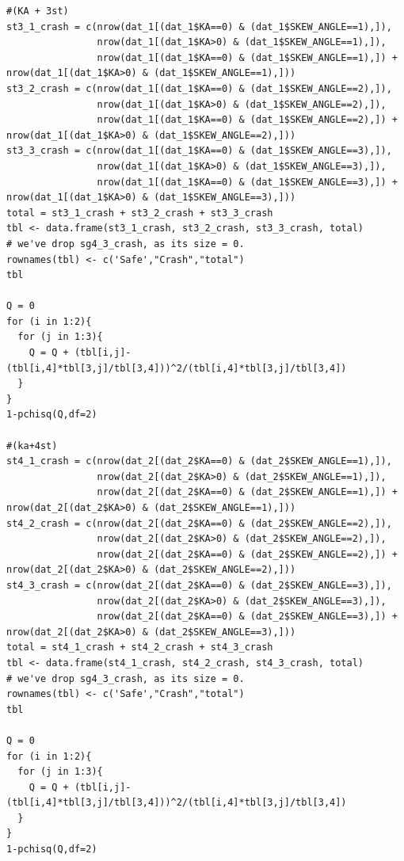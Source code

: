 \documentclass[11pt]{scrartcl} %
\begin{document}
\begin{lstlisting}
#(KA + 3st)
st3_1_crash = c(nrow(dat_1[(dat_1$KA==0) & (dat_1$SKEW_ANGLE==1),]),
                nrow(dat_1[(dat_1$KA>0) & (dat_1$SKEW_ANGLE==1),]),
                nrow(dat_1[(dat_1$KA==0) & (dat_1$SKEW_ANGLE==1),]) + nrow(dat_1[(dat_1$KA>0) & (dat_1$SKEW_ANGLE==1),]))
st3_2_crash = c(nrow(dat_1[(dat_1$KA==0) & (dat_1$SKEW_ANGLE==2),]),
                nrow(dat_1[(dat_1$KA>0) & (dat_1$SKEW_ANGLE==2),]),
                nrow(dat_1[(dat_1$KA==0) & (dat_1$SKEW_ANGLE==2),]) + nrow(dat_1[(dat_1$KA>0) & (dat_1$SKEW_ANGLE==2),]))
st3_3_crash = c(nrow(dat_1[(dat_1$KA==0) & (dat_1$SKEW_ANGLE==3),]),
                nrow(dat_1[(dat_1$KA>0) & (dat_1$SKEW_ANGLE==3),]),
                nrow(dat_1[(dat_1$KA==0) & (dat_1$SKEW_ANGLE==3),]) + nrow(dat_1[(dat_1$KA>0) & (dat_1$SKEW_ANGLE==3),]))
total = st3_1_crash + st3_2_crash + st3_3_crash
tbl <- data.frame(st3_1_crash, st3_2_crash, st3_3_crash, total)
# we've drop sg4_3_crash, as its size = 0.
rownames(tbl) <- c('Safe',"Crash","total")
tbl

Q = 0
for (i in 1:2){
  for (j in 1:3){
    Q = Q + (tbl[i,j]-(tbl[i,4]*tbl[3,j]/tbl[3,4]))^2/(tbl[i,4]*tbl[3,j]/tbl[3,4])
  }
}
1-pchisq(Q,df=2)

#(ka+4st)
st4_1_crash = c(nrow(dat_2[(dat_2$KA==0) & (dat_2$SKEW_ANGLE==1),]),
                nrow(dat_2[(dat_2$KA>0) & (dat_2$SKEW_ANGLE==1),]),
                nrow(dat_2[(dat_2$KA==0) & (dat_2$SKEW_ANGLE==1),]) + nrow(dat_2[(dat_2$KA>0) & (dat_2$SKEW_ANGLE==1),]))
st4_2_crash = c(nrow(dat_2[(dat_2$KA==0) & (dat_2$SKEW_ANGLE==2),]),
                nrow(dat_2[(dat_2$KA>0) & (dat_2$SKEW_ANGLE==2),]),
                nrow(dat_2[(dat_2$KA==0) & (dat_2$SKEW_ANGLE==2),]) + nrow(dat_2[(dat_2$KA>0) & (dat_2$SKEW_ANGLE==2),]))
st4_3_crash = c(nrow(dat_2[(dat_2$KA==0) & (dat_2$SKEW_ANGLE==3),]),
                nrow(dat_2[(dat_2$KA>0) & (dat_2$SKEW_ANGLE==3),]),
                nrow(dat_2[(dat_2$KA==0) & (dat_2$SKEW_ANGLE==3),]) + nrow(dat_2[(dat_2$KA>0) & (dat_2$SKEW_ANGLE==3),]))
total = st4_1_crash + st4_2_crash + st4_3_crash
tbl <- data.frame(st4_1_crash, st4_2_crash, st4_3_crash, total)
# we've drop sg4_3_crash, as its size = 0.
rownames(tbl) <- c('Safe',"Crash","total")
tbl

Q = 0
for (i in 1:2){
  for (j in 1:3){
    Q = Q + (tbl[i,j]-(tbl[i,4]*tbl[3,j]/tbl[3,4]))^2/(tbl[i,4]*tbl[3,j]/tbl[3,4])
  }
}
1-pchisq(Q,df=2)


\end{lstlisting}
\end{document}
